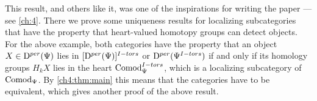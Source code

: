 \begin{addendum}
    This result, and others like it, was one of the inspirations for writing the paper \cite{aambo_2024_localizing} --- see \cref{ch:4}. There we prove some uniqueness results for localizing subcategories that have the property that heart-valued homotopy groups can detect objects. For the above example, both categories have the property that an object $X\in \mathrm{D}^{per}(\Psi)$ lies in $[\mathrm{D}^{per}(\Psi)]^{I-tors}$ or $\mathrm{D}^{per}(\Psi^{I-tors})$ if and only if its homology groups $H_k X$ lies in the heart $\mathrm{Comod}_\Psi^{I-tors}$, which is a localizing subcategory of $\mathrm{Comod}_\Psi$. By \cref{ch4:thm:main} this means that the categories have to be equivalent, which gives another proof of the above result. 
\end{addendum}


